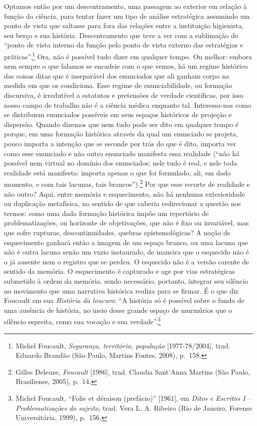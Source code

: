 Optamos então por um descentramento, uma passagem ao exterior em relação
à função da ciência, para tentar fazer um tipo de análise estratégica
assumindo um ponto de vista que saltasse para fora das relações entre a
instituição higienista, seu berço e sua história. Descentramento que
teve a ver com a sublimação do ``ponto de vista interno da função pelo
ponto de vista externo das estratégias e práticas''.\footnote{Michel
  Foucault, \emph{Segurança, território, população} {[}1977-78/2004{]},
  trad. Eduardo Brandão (São Paulo, Martins Fontes, 2008), p.~158.} Ora,
não é possível tudo dizer em qualquer tempo. Ou melhor: embora nem
sempre o que falamos se encadeie com o que vemos, há um regime histórico
das coisas ditas que é inseparável dos enunciados que ali ganham corpo
na medida em que os condiciona. Esse regime de enunciabilidade, ou
formação discursiva, é irredutível a estatutos e pretensões de verdade
científicas, por isso nosso campo de trabalho não é a ciência médica
enquanto tal. Interessa-nos como se distribuem enunciados possíveis em
seus espaços históricos de projeção e dispersão. Quando dizemos que nem
tudo pode ser dito em qualquer tempo é porque, em uma formação histórica
através da qual um enunciado se projeta, pouco importa a intenção que se
esconde por trás do que é dito, importa ver como esse enunciado e não
outro enunciado manifesta essa realidade (``não há possível nem virtual
no domínio dos enunciados; nele tudo é real, e nele toda realidade está
manifesta: importa apenas o que foi formulado, ali, em dado momento, e
com tais lacunas, tais brancos'').\footnote{Gilles Deleuze,
  \emph{Foucault} {[}1986{]}, trad. Claudia Sant'Anna Martins (São
  Paulo, Brasiliense, 2005), p.~14.} Por que esse recorte de realidade e
não outro? Aqui, entre memória e esquecimento, não há nenhuma
exterioridade ou duplicação metafísica, no sentido de que caberia
redirecionar a questão nos termos: como uma dada formação histórica
impõe um repertório de problematizações, ou horizonte de objetivações,
que não é fixo ou invariável, mas que sofre rupturas, descontinuidades,
quebras epistemológicas? A noção de esquecimento ganhará então a imagem
de um espaço branco, ou uma lacuna que não é outra lacuna senão um vazio
instaurado, de maneira que o esquecido não é o já ausente nem o registro
que se perdeu. O esquecido não é a versão carente de sentido da memória.
O esquecimento é capturado e age por vias estratégicas submetido à ordem
da memória, sendo necessário, portanto, integrar seu silêncio no
movimento que uma narrativa histórica realiza para se firmar. É o que
diz Foucault em sua \emph{História da loucura}: ``A história só é
possível sobre o fundo de uma ausência de história, no meio desse grande
espaço de murmúrios que o silêncio espreita, como sua vocação e sua
verdade''.\footnote{Michel Foucault, ``Folie et déraison (prefácio)''
  {[}1961{]}, em \emph{Ditos e Escritos I -- Problematizações do
  sujeito}, trad. Vera L. A. Ribeiro (Rio de Janeiro, Forense
  Universitária, 1999), p.~156.}

